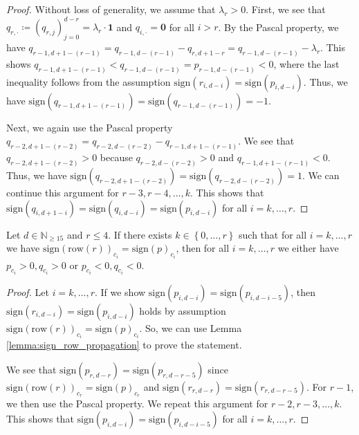 \begin{proof}
    Without loss of generality, we assume that \( \lambda_r > 0 \).
    First, we see that \( q_{r, \cdot} \coloneqq (q_{r,j})_{j=0}^{d-r} = \lambda_r \cdot \mathbf{1} \) and \( q_{i,\cdot} =  \mathbf{0} \) for all \( i > r \). By the Pascal property, we have \( q_{r-1,d+1-(r-1)} = q_{r-1,d-(r-1)} - q_{r,d+1-r} = q_{r-1,d-(r-1)} - \lambda_r \).
    This shows \( q_{r-1,d+1-(r-1)} < q_{r-1,d-(r-1)} = p_{r-1,d-(r-1)} < 0 \), where the last inequality follows from the assumption $\mathrm{sign}(r_{i,d-i}) = \mathrm{sign}(p_{i,d-i})$. Thus, we have \( \mathrm{sign}(q_{r-1,d+1-(r-1)}) = \mathrm{sign}(q_{r-1,d-(r-1)}) = \mathbf -1\). 
    
    Next, we again use the Pascal property \( q_{r-2,d+1-(r-2)} = q_{r-2,d-(r-2)} - q_{r-1,d+1-(r-1)} \). We see that \( q_{r-2,d+1-(r-2)} > 0 \) because \( q_{r-2,d-(r-2)} > 0 \) and \( q_{r-1,d+1-(r-1)} < 0 \). Thus, we have \( \mathrm{sign}(q_{r-2,d+1-(r-2)}) = \mathrm{sign}(q_{r-2,d-(r-2)}) = 1 \). We can continue this argument for \( r-3, r-4, \dots, k \). This shows that \( \mathrm{sign}(q_{i,d+1-i}) = \mathrm{sign}(q_{i,d-i}) = \mathrm{sign}(p_{i,d-i}) \) for all \( i = k, \dots, r\).
\end{proof}

\begin{lemma}\label{lemma:same_sign_propagation_easy}
    Let \( d \in \mathbb{N}_{\geq 15} \) and \( r \leq 4 \). If there exists \( k \in \left\{ 0, \dots, r \right\} \) such that for all \( i = k, \dots, r\) we have \(  \mathrm{sign}(\mathrm{row}(r))_{c_i} = \mathrm{sign}(p)_{c_i} \),
    then for all \( i = k, \dots, r\) we either have \( p_{c_i} > 0, q_{c_i} > 0 \) or \( p_{c_i} < 0, q_{c_i} < 0 \).
\end{lemma}
  
\begin{proof}
    Let \( i=k, \dots, r \). If we show \( \mathrm{sign}(p_{i,d-i}) = \mathrm{sign}(p_{i,d-i-5}) \), then $\mathrm{sign}(r_{i,d-i}) = \mathrm{sign}(p_{i,d-i})$ holds by assumption \( \mathrm{sign}(\mathrm{row}(r))_{c_i} = \mathrm{sign}(p)_{c_i} \). So, we can use Lemma \ref{lemma:sign_row_propagation} to prove the statement. 
    
    We see that \( \mathrm{sign}(p_{r,d-r}) = \mathrm{sign}(p_{r,d-r-5}) \) since \( \mathrm{sign}(\mathrm{row}(r))_{c_r} = \mathrm{sign}(p)_{c_r} \) and \( \mathrm{sign}(r_{r,d-r}) = \mathrm{sign}(r_{r, d - r - 5}) \). For \( r - 1 \), we then use the Pascal property. We repeat this argument for \( r-2, r-3, \dots, k \). This shows that \( \mathrm{sign}(p_{i,d-i}) = \mathrm{sign}(p_{i,d-i-5}) \) for all \( i = k, \dots, r \).
\end{proof}

